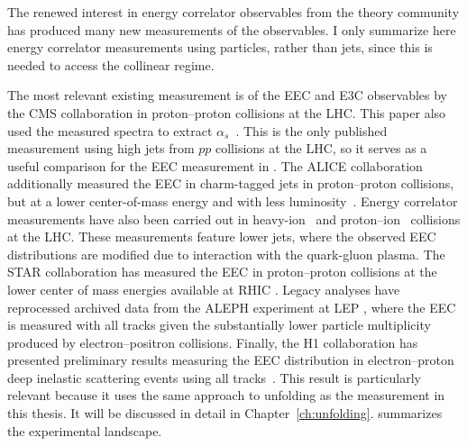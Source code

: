 The renewed interest in energy correlator observables from the theory community has produced many new measurements of the observables.
I only summarize here energy correlator measurements using particles, rather than jets, since this is needed to access the collinear regime.

The most relevant existing measurement is of the EEC and E3C observables by the CMS collaboration in proton--proton collisions at the LHC.
This paper also used the measured spectra to extract $\alpha_s$~\cite{CMS:2024mlf}.
This is the only published measurement using high \pt jets from $pp$ collisions at the LHC, so it serves as a useful comparison for the EEC measurement in .
The ALICE collaboration additionally measured the EEC in charm-tagged jets in proton--proton collisions, but at a lower center-of-mass energy and with less luminosity~\cite{ALICE:2025igw}.
Energy correlator measurements have also been carried out in heavy-ion~\cite{ALICE:2024dfl, CMS:2025ydi} and proton--ion~\cite{Liang-Gilman:2025gjl} collisions at the LHC.
These measurements feature lower \pt jets, where the observed EEC distributions are modified due to interaction with the quark-gluon plasma.
The STAR collaboration has measured the EEC in proton--proton collisions at the lower center of mass energies available at RHIC \cite{STAR:2025jut}.
Legacy analyses have reprocessed archived data from the ALEPH experiment at LEP \cite{Bossi:2024qeu}, where the EEC is measured with all tracks given the substantially lower particle multiplicity produced by electron--positron collisions.
Finally, the H1 collaboration has presented preliminary results measuring the EEC distribution in electron--proton deep inelastic scattering events using all tracks~\cite{H1:prelim}.
This result is particularly relevant because it uses the same approach to unfolding as the measurement in this thesis.
It will be discussed in detail in Chapter~\ref{ch:unfolding}.
 summarizes the experimental landscape.



